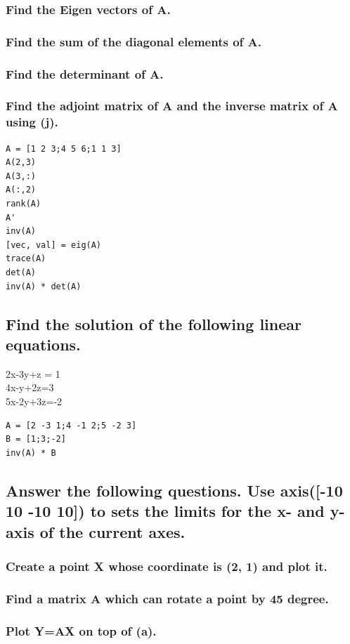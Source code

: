 \documentclass[12pt,a4paper]{article}
\begin{document}
\subsubsection{Find the Eigen vectors of A.} 

\subsubsection{Find the sum of the diagonal elements of A.} 
\subsubsection{Find the determinant of A.} 
\subsubsection{Find the adjoint matrix of A and the inverse matrix of A using (j).} 
\begin{lstlisting}
A = [1 2 3;4 5 6;1 1 3]
A(2,3)
A(3,:)
A(:,2)
rank(A)
A'
inv(A)
[vec, val] = eig(A)
trace(A)
det(A)
inv(A) * det(A)
\end{lstlisting}



\subsection{Find the solution of the following linear equations.} 

2x-3y+z = 1\\
4x-y+2z=3\\
5x-2y+3z=-2
\begin{lstlisting}
A = [2 -3 1;4 -1 2;5 -2 3]
B = [1;3;-2]
inv(A) * B
\end{lstlisting}

\subsection{Answer the following questions.  Use axis([-10 10 -10 10]) to sets the limits for the x- and y-axis of the current axes.} 

\subsubsection{Create a point X whose coordinate is (2, 1) and plot it.} 
\subsubsection{Find a matrix A which can rotate a point by 45 degree.} 
\subsubsection{Plot Y=AX on top of (a).} 
\end{document}
